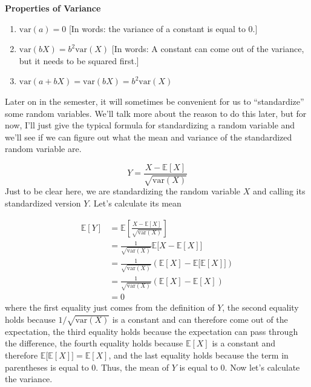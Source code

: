 \documentclass[
  letterpaper,
  DIV=11,
  numbers=noendperiod]{scrreprt}
\begin{document}
\textbf{Properties of Variance}

\begin{enumerate}
\def\labelenumi{\arabic{enumi}.}
\item
  \(\mathrm{var}(a) = 0\) {[}In words: the variance of a constant is
  equal to 0.{]}
\item
  \(\mathrm{var}(bX) = b^2 \mathrm{var}(X)\) {[}In words: A constant can
  come out of the variance, but it needs to be squared first.{]}
\item
  \(\mathrm{var}(a + bX) = \mathrm{var}(bX) = b^2 \mathrm{var}(X)\)
\end{enumerate}

Later on in the semester, it will sometimes be convenient for us to
``standardize'' some random variables. We'll talk more about the reason
to do this later, but for now, I'll just give the typical formula for
standardizing a random variable and we'll see if we can figure out what
the mean and variance of the standardized random variable are.

\[ 
  Y = \frac{ X - \mathbb{E}[X]}{\sqrt{\mathrm{var}(X)}}
\] Just to be clear here, we are standardizing the random variable \(X\)
and calling its standardized version \(Y\). Let's calculate its mean

\[
  \begin{aligned}
    \mathbb{E}[Y] &= \mathbb{E}\left[ \frac{X - \mathbb{E}[X]}{\sqrt{\mathrm{var}(X)}} \right] \\
    &= \frac{1}{\sqrt{\mathrm{var}(X)}} \mathbb{E}\big[ X - \mathbb{E}[X] \big] \\
    &= \frac{1}{\sqrt{\mathrm{var}(X)}} \left( \mathbb{E}[X] - \mathbb{E}\big[\mathbb{E}[X]\big] \right) \\
    &= \frac{1}{\sqrt{\mathrm{var}(X)}} \left( \mathbb{E}[X] - \mathbb{E}[X] \right) \\
    &= 0
  \end{aligned}
\] where the first equality just comes from the definition of \(Y\), the
second equality holds because \(1/\sqrt{\mathrm{var}(X)}\) is a constant
and can therefore come out of the expectation, the third equality holds
because the expectation can pass through the difference, the fourth
equality holds because \(\mathbb{E}[X]\) is a constant and therefore
\(\mathbb{E}\big[\mathbb{E}[X]\big] = \mathbb{E}[X]\), and the last
equality holds because the term in parentheses is equal to 0. Thus, the
mean of \(Y\) is equal to 0. Now let's calculate the variance.
\end{document}
